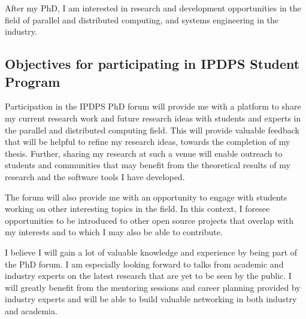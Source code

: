 After my PhD, I am interested in research and development opportunities in
the field of parallel and distributed computing, and systems engineering in
the industry.

\subsection{Objectives for participating in IPDPS Student Program}

Participation in the IPDPS PhD forum will provide me with a platform to share
my current research work and future research ideas with students and experts
in the parallel and distributed computing field. This will provide valuable
feedback that will be helpful to refine my research ideas, towards the
completion of my thesis. Further, sharing my research at such a venue will
enable outreach to students and communities that may benefit from the
theoretical results of my research and the software tools I have developed.

The forum will also provide me with an opportunity to engage with students
working on other interesting topics in the field. In this context, I foresee
opportunities to be introduced to other open source projects that overlap
with my interests and to which I may also be able to contribute.

I believe I will gain a lot of valuable knowledge and experience by being
part of the PhD forum. I am especially looking forward to talks from academic
and industry experts on the latest research that are yet to be seen by the
public. I will greatly benefit from the mentoring sessions and career
planning provided by industry experts and will be able to build valuable
networking in both industry and academia.


